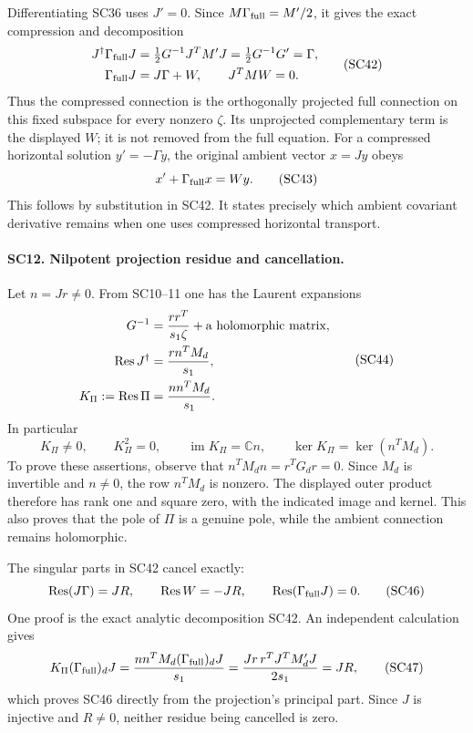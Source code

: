 \documentclass[11pt,a4paper]{article}
\theoremstyle{definition}\newtheorem{definition}[theorem]{Definition}
\begin{document}
Differentiating SC36 uses \(J'=0\). Since
\(M\Gamma_{\rm full}=M'/2\), it gives the exact
compression and decomposition
\[
 \begin{split}
 J^\dagger\Gamma_{\rm full}J
   &=\tfrac12G^{-1}J^TM'J=\tfrac12G^{-1}G'=\Gamma,\\
 \Gamma_{\rm full}J&=J\Gamma+W,\qquad
 J^TMW=0 .
 \end{split}\tag{SC42}
\]
Thus the compressed connection is the orthogonally projected
full connection on this fixed subspace for every nonzero
\(\zeta\). Its unprojected complementary term is the displayed
\(W\); it is not removed from the full equation. For a
compressed horizontal solution \(y'=-\Gamma y\), the
original ambient vector \(x=Jy\) obeys
\[
 x'+\Gamma_{\rm full}x=W y.
 \tag{SC43}
\]
This follows by substitution in SC42. It states precisely
which ambient covariant derivative remains when one uses
compressed horizontal transport.

\paragraph{SC12. Nilpotent projection residue and cancellation.}
Let \(n=Jr\ne0\). From SC10--11 one has the Laurent expansions
\[
 \begin{split}
 G^{-1}&=\frac{rr^T}{s_1\zeta}+\hbox{a holomorphic matrix},\\
 \operatorname{Res}J^\dagger&=\frac{r n^TM_d}{s_1},\\
 K_\Pi:=\operatorname{Res}\Pi&=\frac{n n^TM_d}{s_1}.
 \end{split}\tag{SC44}
\]
In particular
\[
 K_\Pi\ne0,\qquad K_\Pi^2=0,\qquad
 \operatorname{im}K_\Pi=\mathbb Cn,\qquad
 \ker K_\Pi=\ker(n^TM_d).
 \tag{SC45}
\]
To prove these assertions, observe that
\(n^TM_dn=r^TG_dr=0\). Since \(M_d\) is invertible and
\(n\ne0\), the row \(n^TM_d\) is nonzero. The displayed
outer product therefore has rank one and square zero,
with the indicated image and kernel. This also proves that
the pole of \(\Pi\) is a genuine pole, while the ambient
connection remains holomorphic.

The singular parts in SC42 cancel exactly:
\[
 \operatorname{Res}(J\Gamma)=JR,\qquad
 \operatorname{Res}W=-JR,\qquad
 \operatorname{Res}(\Gamma_{\rm full}J)=0 .
 \tag{SC46}
\]
One proof is the exact analytic decomposition SC42.
An independent calculation gives
\[
 K_\Pi(\Gamma_{\rm full})_dJ
  =\frac{n n^TM_d(\Gamma_{\rm full})_dJ}{s_1}
  =\frac{Jr\,r^TJ^TM'_dJ}{2s_1}
  =JR ,
 \tag{SC47}
\]
which proves SC46 directly from the projection's principal
part. Since \(J\) is injective and \(R\ne0\), neither residue
being cancelled is zero.
\end{document}
